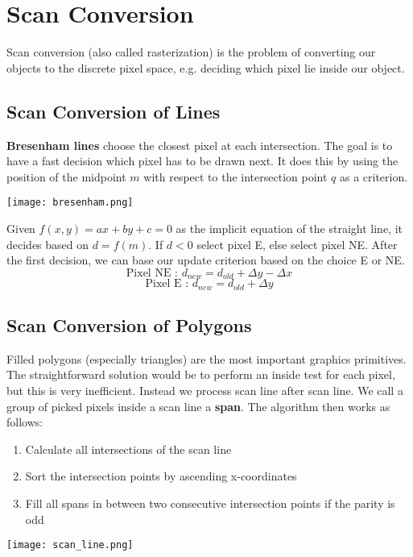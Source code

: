 \section{Scan Conversion}

Scan conversion (also called rasterization) is the problem of converting our objects to the discrete pixel space, e.g. deciding which pixel lie inside our object. 


\subsection{Scan Conversion of Lines}

\textbf{Bresenham lines} choose the closest pixel at each intersection. The goal is to have a fast decision which pixel has to be drawn next. It does this by using the position of the midpoint $m$ with respect to the intersection point $q$ as a criterion.
\begin{center}
	\texttt{[image: bresenham.png]}
\end{center}

Given $f(x,y) = ax + by + c = 0$ as the implicit equation of the straight line, it decides based on $d = f(m)$. If $d < 0$ select pixel E, else select pixel NE. After the first decision, we can base our update criterion based on the choice E or NE.
$$\text{Pixel NE : } d_{new} = d_{old} + \Delta y - \Delta x$$
$$\text{Pixel E : } d_{new} = d_{old} + \Delta y$$

\subsection{Scan Conversion of Polygons}

Filled polygons (especially triangles) are the most important graphics primitives. The straightforward solution would be to perform an inside test for each pixel, but this is very inefficient. Instead we process scan line after scan line. We call a group of picked pixels inside a scan line a \textbf{span}. The algorithm then works as follows:
\begin{enumerate}
	\item Calculate all intersections of the scan line
	\item Sort the intersection points by ascending x-coordinates
	\item Fill all spans in between two consecutive intersection points if the parity is odd
\end{enumerate}

\begin{center}
	\texttt{[image: scan\_line.png]}
\end{center}
